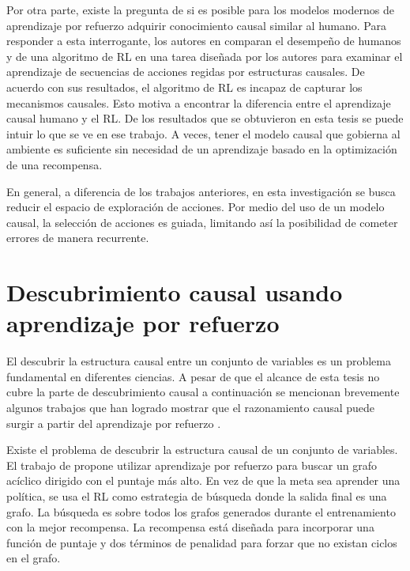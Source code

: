 Por otra parte, existe la pregunta de si es posible para los modelos modernos de aprendizaje por refuerzo adquirir conocimiento causal similar al humano. Para responder a esta interrogante,  los autores en \cite{edmonds2018human} comparan el desempeño de humanos y de una algoritmo de RL en una tarea diseñada por los autores para examinar el aprendizaje de secuencias de acciones regidas por estructuras causales.  De acuerdo con sus resultados, el algoritmo de RL es incapaz de capturar los mecanismos causales. Esto motiva a encontrar la diferencia entre el aprendizaje causal humano y el RL. De los resultados que se obtuvieron en esta tesis se puede intuir lo que se ve en ese trabajo. A veces, tener el modelo causal que gobierna al ambiente es suficiente sin necesidad de un aprendizaje basado en la optimización de una recompensa.

En general, a diferencia de los trabajos anteriores,
en esta investigación se busca reducir el espacio de exploración
de acciones. 
Por medio del uso de un modelo causal, la selección de acciones es guiada, limitando así la posibilidad de cometer errores de manera recurrente.

\section{Descubrimiento causal usando aprendizaje por refuerzo}

El descubrir la estructura causal entre un conjunto de variables es un problema
fundamental en diferentes ciencias. A pesar de que 
el alcance de esta tesis no cubre la parte de descubrimiento causal 
a continuación se mencionan brevemente algunos trabajos 
que han logrado mostrar que el razonamiento causal puede surgir a partir del aprendizaje por refuerzo \cite{dasgupta2019causal, madumal2019explainable, zhu2019causal}. 


Existe el problema de descubrir la estructura causal de un conjunto de variables. El trabajo  de \cite{zhu2019causal} propone utilizar aprendizaje por refuerzo para buscar un grafo acíclico dirigido con el puntaje más alto. En vez de que la meta sea aprender una política, se usa el RL como estrategia de búsqueda donde la salida final es una grafo. La búsqueda es sobre todos los grafos generados durante el entrenamiento con la mejor recompensa. La recompensa está diseñada para incorporar una función de puntaje y dos términos de penalidad para forzar que no existan ciclos en el grafo.

